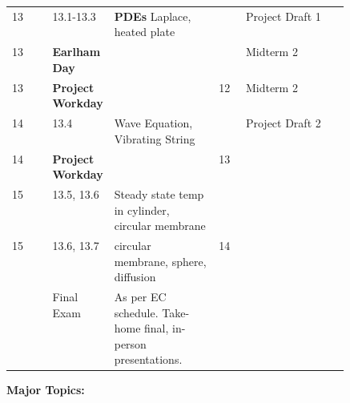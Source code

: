 \documentclass[12pt]{article}
\begin{document}
{\begin{table}[h]
\begin{tabular}{l|l|p{0.18\linewidth}|p{0.31\linewidth}|l|l}
13            &       & 13.1-13.3 & \textbf{PDEs} Laplace, heated plate &  & Project Draft 1                 \\ 
13             &      & \textbf{Earlham Day} &  &  &   Midterm 2               \\ 
13             &      & \textbf{Project Workday} &  & 12 &   Midterm 2               \\ \hline  
14             &    & 13.4 & Wave Equation, Vibrating String &  & Project Draft 2                 \\ 
14             &       & \textbf{Project Workday} &  & 13 &                 \\ \hline 
15             &        &13.5, 13.6 & Steady state temp in cylinder, circular membrane &  &                  \\ 
15             &        & 13.6, 13.7 & circular membrane, sphere, diffusion & 14 &                 \\ \hline \hline
              &       & Final Exam & As per EC schedule. Take-home final, in-person presentations.  &                      &                   \\ 
\end{tabular}
\end{table}



\newpage

\noindent \textbf{Major Topics:} 

}
\end{document}
